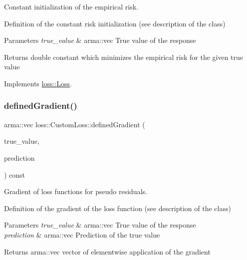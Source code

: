 Constant initialization of the empirical risk. 

Definition of the constant risk initialization (see description of the class)


\begin{DoxyParams}{Parameters}
{\em true\+\_\+value} & {\ttfamily arma\+::vec} True value of the response\\
\hline
\end{DoxyParams}
\begin{DoxyReturn}{Returns}
{\ttfamily double} constant which minimizes the empirical risk for the given true value 
\end{DoxyReturn}


Implements \mbox{\hyperlink{classloss_1_1_loss_a65fe7dcd9370e6a549b8d1cc95fc8798}{loss\+::\+Loss}}.

\mbox{\label{classloss_1_1_custom_loss_a3a79dc019e781c2956b52fb8e1cfcc56}} 
\subsubsection{\texorpdfstring{defined\+Gradient()}{definedGradient()}}
{\footnotesize\ttfamily arma\+::vec loss\+::\+Custom\+Loss\+::defined\+Gradient (\begin{DoxyParamCaption}\item[{const arma\+::vec \&}]{true\+\_\+value,  }\item[{const arma\+::vec \&}]{prediction }\end{DoxyParamCaption}) const\hspace{0.3cm}{\ttfamily [virtual]}}



Gradient of loss functions for pseudo residuals. 

Definition of the gradient of the loss function (see description of the class)


\begin{DoxyParams}{Parameters}
{\em true\+\_\+value} & {\ttfamily arma\+::vec} True value of the response \\
\hline
{\em prediction} & {\ttfamily arma\+::vec} Prediction of the true value\\
\hline
\end{DoxyParams}
\begin{DoxyReturn}{Returns}
{\ttfamily arma\+::vec} vector of elementwise application of the gradient 
\end{DoxyReturn}



